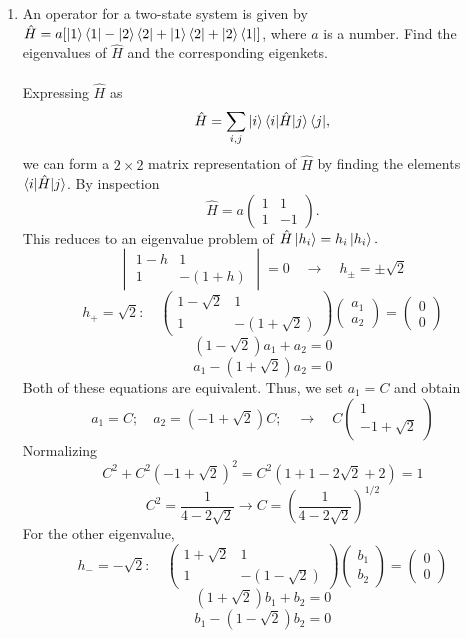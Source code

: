 \documentclass[11pt,letterpaper]{article}
\begin{document}
\begin{enumerate}
\item An operator for a two-state system is given by $\hat H = a[\ket 1\bra 1 - \ket 2\bra 2 + \ket1\bra 2 + \ket 2\bra 1]$, where $a$ is a number. Find the eigenvalues of $\hat H$ and the corresponding eigenkets.
\\ \\ Expressing $\hat H$ as 
$$\hat H = \sum_{i,j}{\ket i \braket{i|\hat H|j}\bra j},$$
we can form a $2\times2$ matrix representation of $\hat H$ by finding the elements $\braket{i|\hat H|j}$. By inspection
$$\hat H = a\begin{pmatrix}1&1\\1&-1\end{pmatrix}.$$
This reduces to an eigenvalue problem of $\hat H\ket{h_i} = h_i\ket{h_i}.$
$$\begin{vmatrix}1-h&1\\1&-(1+h)\end{vmatrix} = 0 \quad \rightarrow \quad h_{\pm}=\pm\sqrt2$$
$$h_+ = \sqrt2 : \quad \begin{pmatrix}1-\sqrt2&1\\1&-(1+\sqrt2)\end{pmatrix}\begin{pmatrix}a_1\\a_2\end{pmatrix} = \begin{pmatrix}0\\0\end{pmatrix}$$
$$(1-\sqrt2)a_1 + a_2 = 0$$ $$a_1 -(1+\sqrt2)a_2 = 0$$
Both of these equations are equivalent. Thus, we set $a_1 = C$ and obtain
$$a_1 = C; \quad a_2 = (-1+\sqrt2)C;\quad \rightarrow\quad C\begin{pmatrix}1\\-1+\sqrt2\end{pmatrix}$$
Normalizing
$$C^2 + C^2(-1+\sqrt2)^2 = C^2(1+1-2\sqrt2 +2)=1$$
$$C^2 = \frac{1}{4-2\sqrt2}\rightarrow C=\left(\frac{1}{4-2\sqrt2}\right)^{1/2}$$
For the other eigenvalue,
$$h_- = -\sqrt2 : \quad \begin{pmatrix}1+\sqrt2&1\\1&-(1-\sqrt2)\end{pmatrix}\begin{pmatrix}b_1\\b_2\end{pmatrix} = \begin{pmatrix}0\\0\end{pmatrix}$$
$$(1+\sqrt2)b_1 + b_2 = 0$$ $$b_1 -(1-\sqrt2)b_2 = 0$$

\end{enumerate}
\end{document}
